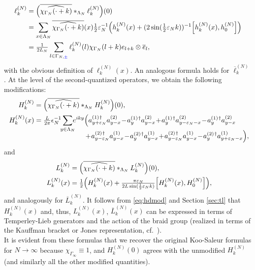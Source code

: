 \documentclass[a4paper, 11pt]{article}
\DeclareMathOperator{\1}{\mathds{1}}
\begin{document}
\begin{align}
\label{eq:KSmod1p}
\ell^{(N)}_{k} & = \Big(\overline{\widehat{\chi_{\Gamma_{N}}(\cdot+k)}}\ast_{\Lambda_{N}}\ell^{(N)}_{k}\Big)(0) \\ \nonumber
& = \sum_{x\in\Lambda_{N}}\overline{\widehat{\chi_{\Gamma_{N}}(\cdot+k)}}(x)\tfrac{1}{2}\vep_{N}^{-1}\Big(h_{k}^{(N)}(x)+(2\sin(\tfrac{1}{2}\vep_{N}k))^{-1}\Big[h_{k}^{(N)}(x),h^{(N)}_{0}\Big]\Big) \\ \nonumber
& = \tfrac{1}{2L_{N}}\sum_{l\in\Gamma_{N,{\color{blue}\pm}}}\ell^{(N)}_{k}(l)\chi_{\Gamma_{N}}(l+k)e_{l+k}\otimes \overline{e}_{l},
\end{align}
with the obvious definition of $\ell^{(N)}_{k}(x)$. An analogous formula holds for $\overline{\ell}^{(N)}_{k}$. At the level of the second-quantized operators, we obtain the following modifications:
\begin{align}
\label{eq:hdmod}
H^{(N)}_{k} & = \Big(\overline{\widehat{\chi_{\Gamma_{N}}(\cdot+k)}}\ast_{\Lambda_{N}}H^{(N)}_{k}\Big)(0), \\ \nonumber
H^{(N)}_{k}(x) & = \tfrac{L}{2\pi}\epsilon_{N}^{-1}\!\!\sum_{y\in\Lambda_{N}}\!\!\!e^{iky}\Big(a^{(1)\!\!\ \dagger}_{y+\vep_{N}}a^{(2)}_{y-x}\!-\!a^{(1)\!\!\ \dagger}_{y}a^{(2)}_{y-x}\!+\!a^{(1)\!\!\ \dagger}_{y}a^{(2)}_{y-\vep_{N}-x}\!-\!a^{(1)\!\!\ \dagger}_{y}a^{(2)}_{y-x} \\[-0.25cm] \nonumber
 & \hspace{2.6cm} \!+\!a^{(2)\!\!\ \dagger}_{y-\vep_{N}}a^{(1)}_{y-x}\!-\!a^{(2)\!\!\ \dagger}_{y}a^{(1)}_{y-x}\!+\!a^{(2)\!\!\ \dagger}_{y-\vep_{N}}a^{(1)}_{y-x}\!-\!a^{(2)\!\!\ \dagger}_{y}a^{(1)}_{y+\vep_{N}-x}\Big),
\end{align}
and
\begin{align}
\label{eq:KSmod}
L^{(N)}_{k} & = \Big(\overline{\widehat{\chi_{\Gamma_{N}}(\cdot+k)}}\ast_{\Lambda_{N}}L^{(N)}_{k}\Big)(0), \\ \nonumber
L^{(N)}_{k}(x) & = \tfrac{1}{2}\Big(H_{k}^{(N)}(x)+\tfrac{\pi\vep_{N}}{2L\sin(\frac{1}{2}\vep_{N}k)}\Big[H_{k}^{(N)}(x),H_0^{(N)}\Big]\Big),
\end{align}
and analogously for $\overline{L}^{(N)}_{k}$. It follows from \eqref{eq:hdmod} and Section \ref{sec:tl} that $H^{(N)}_{k}(x)$ and, thus, $L^{(N)}_{k}(x)$, $\overline{L}^{(N)}_{k}(x)$ can be expressed in terms of Temperley-Lieb generators and the action of the braid group (realized in terms of the Kauffman bracket or Jones representation, cf.~\cite{SchuetzDualityTwistedBoundary, StottmeisterAnyonBraidingAnd}).\\
It is evident from these formulas that we recover the original Koo-Saleur formulas for $N\rightarrow\infty$ because $\chi_{\Gamma_{\infty}}\equiv1$, and $H^{(N)}_{k}(0)$ agrees with the unmodified $H^{(N)}_{k}$ (and similarly all the other modified quantities).
\end{document}
